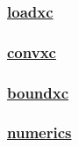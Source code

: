 \documentclass[]{article}
\begin{document}
\subsubsection{\texorpdfstring{\href{loadxc.html}{loadxc}}{loadxc}}\label{loadxc}

\subsubsection{\texorpdfstring{\href{convxc.html}{convxc}}{convxc}}\label{convxc}

\subsubsection{\texorpdfstring{\href{boundxc.html}{boundxc}}{boundxc}}\label{boundxc}

\subsubsection{\texorpdfstring{\href{numerics.html}{numerics}}{numerics}}\label{numerics}
\end{document}
